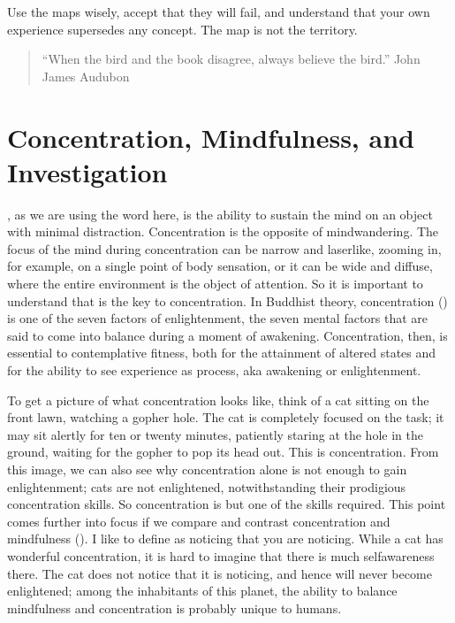 \documentclass[a5paper,10pt,english]{book}
\begin{document}
\sphinxAtStartPar
Use the maps wisely, accept that they will fail, and understand that
your own experience supersedes any concept. The map is not the
territory.
\begin{quote}

\sphinxAtStartPar
“When the bird and the book disagree, always believe the bird.” \sphinxhyphen{}
John James Audubon
\end{quote}


\section{Concentration, Mindfulness, and Investigation}
\label{\detokenize{main-2:concentration-mindfulness-and-investigation}}
\sphinxAtStartPar
{}, as we are using the word here, is the ability to
sustain the mind on an object with minimal distraction. Concentration is
the opposite of mind\sphinxhyphen{}wandering. The focus of the mind during
concentration can be narrow and laser\sphinxhyphen{}like, zooming in, for example, on
a single point of body sensation, or it can be wide and diffuse, where
the entire environment is the object of attention. So it is important to
understand that  is the key to concentration. In
Buddhist theory, concentration () is one of the seven factors
of enlightenment, the seven mental factors that are said to come into
balance during a moment of awakening. Concentration, then, is essential
to contemplative fitness, both for the attainment of altered states and
for the ability to see experience as process, aka awakening or
enlightenment.

\sphinxAtStartPar
To get a picture of what concentration looks like, think of a cat
sitting on the front lawn, watching a gopher hole. The cat is completely
focused on the task; it may sit alertly for ten or twenty minutes,
patiently staring at the hole in the ground, waiting for the gopher to
pop its head out. This is concentration. From this image, we can also
see why concentration alone is not enough to gain enlightenment; cats
are not enlightened, notwithstanding their prodigious concentration
skills. So concentration is but one of the skills required. This point
comes further into focus if we compare and contrast concentration and
mindfulness (). I like to define  as noticing that
you are noticing. While a cat has wonderful concentration, it is hard to
imagine that there is much self\sphinxhyphen{}awareness there. The cat does not notice
that it is noticing, and hence will never become enlightened; among the
inhabitants of this planet, the ability to balance mindfulness and
concentration is probably unique to humans.
\end{document}
